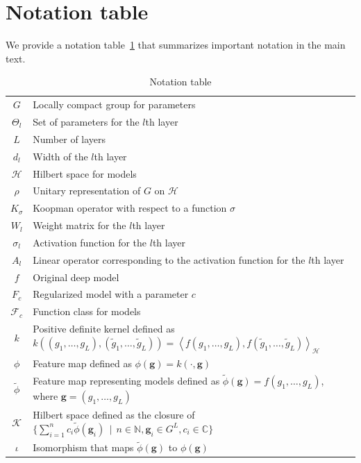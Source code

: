 \documentclass[twoside]{article}
\def\mcl#1{\mathcal{#1}}
\def\bracket#1{\left\langle #1\right\rangle}
\def\hil{\mcl{H}}
\begin{document}
\section{Notation table}
We provide a notation table~\ref{tab1} that summarizes important notation in the main text.
\begin{table}[t]
\caption{Notation table}\label{tab1}
\vspace{.3cm}
\renewcommand{\arraystretch}{1.1}
 \begin{tabularx}{\linewidth}{|c|X|}
\hline
$G$ & Locally compact group for parameters\\
$\Theta_l$ & Set of parameters for the $l$th layer\\
$L$ & Number of layers\\
$d_l$ & Width of the $l$th layer\\
$\hil$ & Hilbert space for models\\
$\rho$ & Unitary representation of $G$ on $\hil$\\
$K_{\sigma}$ & Koopman operator with respect to a function $\sigma$\\
$W_l$ & Weight matrix for the $l$th layer\\
$\sigma_l$ & Activation function for the $l$th layer\\
$A_l$ & Linear operator corresponding to the activation function for the $l$th layer\\
$f$ & Original deep model\\
$F_c$ & Regularized model with a parameter $c$\\
$\mcl{F}_c$ & Function class for models\\
$k$ & Positive definite kernel defined as $k((g_1,\ldots,g_L),(\tilde{g}_1,\ldots,\tilde{g}_L))=\bracket{f(g_1,\ldots,g_L),f(\tilde{g}_1,\ldots,\tilde{g}_L)}_{\hil}$\\
$\phi$ & Feature map defined as $\phi(\mathbf{g})=k(\cdot,\mathbf{g})$\\
$\tilde{\phi}$ & Feature map representing models defined as $\tilde{\phi}(\mathbf{g})=f(g_1,\ldots,g_L)$, where $\mathbf{g}=(g_1,\ldots,g_L)$\\
$\mcl{K}$ & Hilbert space defined as the closure of $\{\sum_{i=1}^nc_i\tilde{\phi}(\mathbf{g}_i)\,\mid\, n\in\mathbb{N},\mathbf{g}_i\in G^L, c_i\in\mathbb{C}\}$\\
$\iota$ & Isomorphism that maps $\tilde{\phi}(\mathbf{g})$ to $\phi(\mathbf{g})$\\
\hline
 \end{tabularx}
\renewcommand{\arraystretch}{1} 
\end{table}
\end{document}
